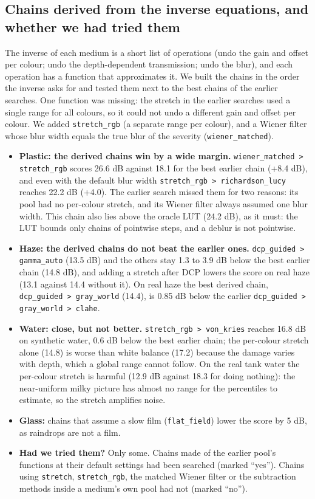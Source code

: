 \documentclass[10pt,a4paper]{article}
\begin{document}
\subsection{Chains derived from the inverse equations, and whether we had tried them}
\label{sec:theorychains}
The inverse of each medium is a short list of operations (undo the gain and offset per colour; undo the depth-dependent transmission; undo the blur), and each operation has a function that approximates it. We built the chains in the order the inverse asks for and tested them next to the best chains of the earlier searches. One function was missing: the stretch in the earlier searches used a single range for all colours, so it could not undo a different gain and offset per colour. We added \texttt{stretch\_rgb} (a separate range per colour), and a Wiener filter whose blur width equals the true blur of the severity (\texttt{wiener\_matched}).
{\small}
\begin{itemize}
\item \textbf{Plastic: the derived chains win by a wide margin.} \texttt{wiener\_matched > stretch\_rgb} scores 26.6 dB against 18.1 for the best earlier chain (+8.4 dB), and even with the default blur width \texttt{stretch\_rgb > richardson\_lucy} reaches 22.2 dB (+4.0). The earlier search missed them for two reasons: its pool had no per-colour stretch, and its Wiener filter always assumed one blur width. This chain also lies above the oracle LUT (24.2 dB), as it must: the LUT bounds only chains of pointwise steps, and a deblur is not pointwise.
\item \textbf{Haze: the derived chains do not beat the earlier ones.} \texttt{dcp\_guided > gamma\_auto} (13.5 dB) and the others stay 1.3 to 3.9 dB below the best earlier chain (14.8 dB), and adding a stretch after DCP lowers the score on real haze (13.1 against 14.4 without it). On real haze the best derived chain, \texttt{dcp\_guided > gray\_world} (14.4), is 0.85 dB below the earlier \texttt{dcp\_guided > gray\_world > clahe}.
\item \textbf{Water: close, but not better.} \texttt{stretch\_rgb > von\_kries} reaches 16.8 dB on synthetic water, 0.6 dB below the best earlier chain; the per-colour stretch alone (14.8) is worse than white balance (17.2) because the damage varies with depth, which a global range cannot follow. On the real tank water the per-colour stretch is harmful (12.9 dB against 18.3 for doing nothing): the near-uniform milky picture has almost no range for the percentiles to estimate, so the stretch amplifies noise.
\item \textbf{Glass:} chains that assume a slow film (\texttt{flat\_field}) lower the score by 5 dB, as raindrops are not a film.
\item \textbf{Had we tried them?} Only some. Chains made of the earlier pool's functions at their default settings had been searched (marked ``yes''). Chains using \texttt{stretch}, \texttt{stretch\_rgb}, the matched Wiener filter or the subtraction methods inside a medium's own pool had not (marked ``no'').
\end{itemize}
\end{document}
